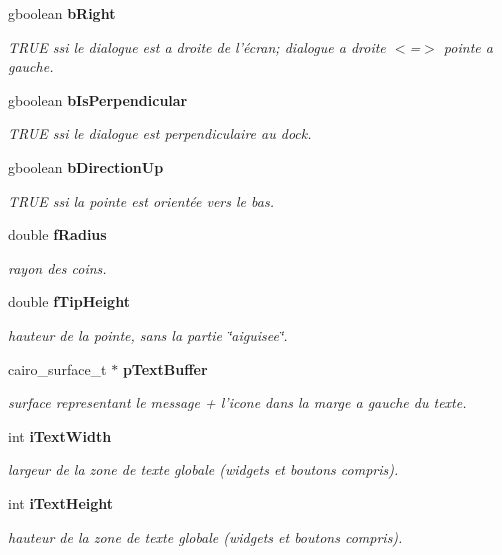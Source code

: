 \begin{CompactItemize}
gboolean {\bf bRight}
\begin{CompactList}\small\item\em TRUE ssi le dialogue est a droite de l'écran; dialogue a droite $<$=$>$ pointe a gauche. \item\end{CompactList}\item 
gboolean {\bf bIsPerpendicular}
\begin{CompactList}\small\item\em TRUE ssi le dialogue est perpendiculaire au dock. \item\end{CompactList}\item 
gboolean {\bf bDirectionUp}
\begin{CompactList}\small\item\em TRUE ssi la pointe est orientée vers le bas. \item\end{CompactList}\item 
double {\bf fRadius}
\begin{CompactList}\small\item\em rayon des coins. \item\end{CompactList}\item 
double {\bf fTipHeight}
\begin{CompactList}\small\item\em hauteur de la pointe, sans la partie \char`\"{}aiguisee\char`\"{}. \item\end{CompactList}\item 
cairo\_\-surface\_\-t $\ast$ {\bf pTextBuffer}
\begin{CompactList}\small\item\em surface representant le message + l'icone dans la marge a gauche du texte. \item\end{CompactList}\item 
int {\bf iTextWidth}
\begin{CompactList}\small\item\em largeur de la zone de texte globale (widgets et boutons compris). \item\end{CompactList}\item 
int {\bf iTextHeight}
\begin{CompactList}\small\item\em hauteur de la zone de texte globale (widgets et boutons compris). \item\end{CompactList}\item 

\end{CompactItemize}
